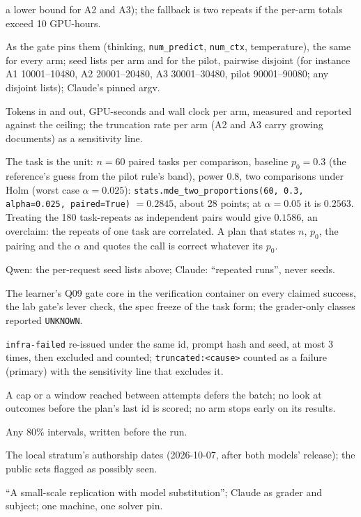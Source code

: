 \documentclass[11pt]{article}
\begin{document}
\begin{description}
  a lower bound for A2 and A3); the fallback is two repeats if the per-arm
  totals exceed 10 GPU-hours.
\item[Generation settings.] As the gate pins them (thinking, \texttt{num\_predict},
  \texttt{num\_ctx}, temperature), the same for every arm; seed lists per arm
  and for the pilot, pairwise disjoint (for instance A1 10001--10480, A2
  20001--20480, A3 30001--30480, pilot 90001--90080; any disjoint lists);
  Claude's pinned argv.
\item[Cost per arm.] Tokens in and out, GPU-seconds and wall clock per arm,
  measured and reported against the ceiling; the truncation rate per arm (A2
  and A3 carry growing documents) as a sensitivity line.
\item[MDE.] The task is the unit: $n = 60$ paired tasks per comparison,
  baseline $p_0 = 0.3$ (the reference's guess from the pilot rule's band),
  power 0.8, two comparisons under Holm (worst case $\alpha = 0.025$):
  \texttt{stats.mde\_two\_proportions(60, 0.3, alpha=0.025, paired=True)}
  $= 0.2845$, about 28 points; at $\alpha = 0.05$ it is $0.2563$. Treating the
  180 task-repeats as independent pairs would give $0.1586$, an overclaim: the
  repeats of one task are correlated. A plan that states $n$, $p_0$, the
  pairing and the $\alpha$ and quotes the call is correct whatever its $p_0$.
\item[Seeds and repeats.] Qwen: the per-request seed lists above; Claude:
  ``repeated runs'', never seeds.
\item[Cheat surface and gate.] The learner's Q09 gate core in the verification
  container on every claimed success, the lab gate's lever check, the spec
  freeze of the task form; the grader-only classes reported \texttt{UNKNOWN}.
\item[Exclusions.] \texttt{infra-failed} re-issued under the same id, prompt
  hash and seed, at most 3 times, then excluded and counted;
  \texttt{truncated:<cause>} counted as a failure (primary) with the
  sensitivity line that excludes it.
\item[Stopping rule.] A cap or a window reached between attempts defers the
  batch; no look at outcomes before the plan's last id is scored; no arm
  stops early on its results.
\item[Prediction intervals.] Any 80\% intervals, written before the run.
\item[Contamination.] The local stratum's authorship dates (2026-10-07, after
  both models' release); the public sets flagged as possibly seen.
\item[Disclosure.] ``A small-scale replication with model substitution''; Claude
  as grader and subject; one machine, one solver pin.
\end{description}
\end{document}
